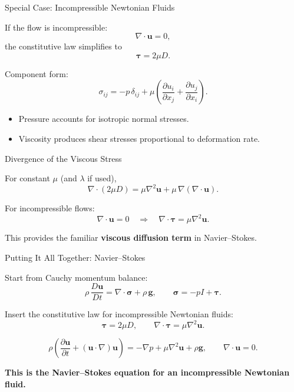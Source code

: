 \documentclass[aspectratio=169]{beamer}
\begin{document}
\begin{frame}{Special Case: Incompressible Newtonian Fluids}

If the flow is incompressible:
\[
\nabla\!\cdot\mathbf{u}=0,
\]
the constitutive law simplifies to
\[
\boldsymbol{\tau}=2\mu D.
\]

Component form:
\[
\sigma_{ij}
=
-p\,\delta_{ij}
+
\mu\!\left(
\frac{\partial u_i}{\partial x_j}
+
\frac{\partial u_j}{\partial x_i}
\right).
\]

\begin{itemize}
\item Pressure accounts for isotropic normal stresses.
\item Viscosity produces shear stresses proportional to deformation rate.
\end{itemize}

\end{frame}

\begin{frame}{Divergence of the Viscous Stress}

For constant $\mu$ (and $\lambda$ if used),
\[
\nabla\!\cdot(2\mu D)
=
\mu \nabla^2 \mathbf{u}
+
\mu\,\nabla(\nabla\!\cdot\mathbf{u}).
\]

\medskip

For incompressible flows:
\[
\nabla\!\cdot\mathbf{u}=0
\quad\Rightarrow\quad
\nabla\!\cdot\boldsymbol{\tau}
=
\mu \nabla^2 \mathbf{u}.
\]

This provides the familiar \textbf{viscous diffusion term} in Navier–Stokes.

\end{frame}

\begin{frame}{Putting It All Together: Navier–Stokes}

Start from Cauchy momentum balance:
\[
\rho\,\frac{D\mathbf{u}}{Dt}
=
\nabla\!\cdot \boldsymbol{\sigma}
+
\rho\,\mathbf{g},
\qquad
\boldsymbol{\sigma}
=
-pI + \boldsymbol{\tau}.
\]

Insert the constitutive law for incompressible Newtonian fluids:
\[
\boldsymbol{\tau}=2\mu D,
\qquad
\nabla\!\cdot\boldsymbol{\tau}
=\mu\nabla^2\mathbf{u}.
\]

\[
\boxed{
\rho\left(
\frac{\partial\mathbf{u}}{\partial t}
+
(\mathbf{u}\!\cdot\!\nabla)\mathbf{u}
\right)
=
-\nabla p
+
\mu\nabla^2\mathbf{u}
+
\rho\mathbf{g},
\qquad
\nabla\!\cdot\mathbf{u}=0.
}
\]

\textbf{This is the Navier–Stokes equation for an incompressible Newtonian fluid.}

\end{frame}
\end{document}
